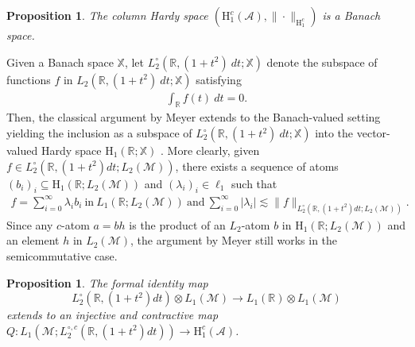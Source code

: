 \documentclass[psamsfonts]{amsart}
\newtheorem{proposition}[theorem]{Proposition}
\newcommand{\Lone}{L_1}
\newcommand{\Ltwo}{L_2}
\newcommand{\Ltwozero}{L_2^\circ}
\newcommand{\Ltwoczero}{L^{\circ,c}_2}
\newcommand{\Hone}{\mathrm{H}_1}
\newcommand{\Honec}{\mathrm{H}_1^c}
\newcommand{\Hardyc}{\Honec(\mathcal{A})}
\begin{document}
    
    \begin{proposition}\label{prop:H1cBanach}
        The column Hardy space $(\Hardyc,\|\cdot\|_{\Honec})$ is a Banach space.
    \end{proposition}
    
   
    Given a Banach space $\mathbb{X}$, let $\Ltwozero(\mathbb{R},(1+t^2) \ dt;\mathbb{X})$ denote the subspace of functions $f$ in $\Ltwo(\mathbb{R},(1+t^2) \ dt;\mathbb{X})$ satisfying
    \begin{align*}
        \int_{\mathbb{R}} f(t) \ dt = 0.
    \end{align*}
    Then, the classical argument by Meyer \cite[Chapter 5, Proposition 1]{Mey90} extends to the Banach-valued setting yielding the inclusion as a subspace of $\Ltwozero(\mathbb{R},(1+t^2) \ dt;\mathbb{X})$ into the vector-valued Hardy space $\Hone(\mathbb{R};\mathbb{X})$ \cite{H06}. More clearly, given $f \in \Ltwozero(\mathbb{R},(1+t^{2})dt;\Ltwo(\mathcal{M}))$, there exists a sequence of atoms $(b_i)_i \subseteq \Hone(\mathbb{R};\Ltwo(\mathcal{M}))$ and $(\lambda_i)_i \in \ell_1$ such that
    \begin{align}\label{eq:atommeyer}
        f = \sum_{i=0}^\infty \lambda_i b_i \ \mathrm{in} \ \Lone(\mathbb{R};\Ltwo(\mathcal{M})) \ \mathrm{and} \ \sum_{i=0}^\infty |\lambda_i| \lesssim \|f\|_{\Ltwozero(\mathbb{R},(1+t^2)dt;\Ltwo(\mathcal{M}))}.
    \end{align}
    Since any $c$-atom $a = bh$ is the product of an $\Ltwo$-atom $b$ in $\Hone(\mathbb{R};\Ltwo(\mathcal{M}))$ and an element $h$ in $\Ltwo(\mathcal{M})$, the argument by Meyer still works in the semicommutative case. 
    \begin{proposition}\label{prop:meyerMap}
      The formal identity map
      $$
      \Ltwozero(\mathbb{R},(1+t^2)dt)\otimes \Lone(\mathcal M) \to
      \Lone(\mathbb{R})\otimes\Lone(\mathcal M)$$ extends to an injective and 
      contractive map $Q: \Lone(\mathcal M; \Ltwoczero(\mathbb{R},(1+t^2)dt))\to \Hardyc$.    \end{proposition}
\end{document}
